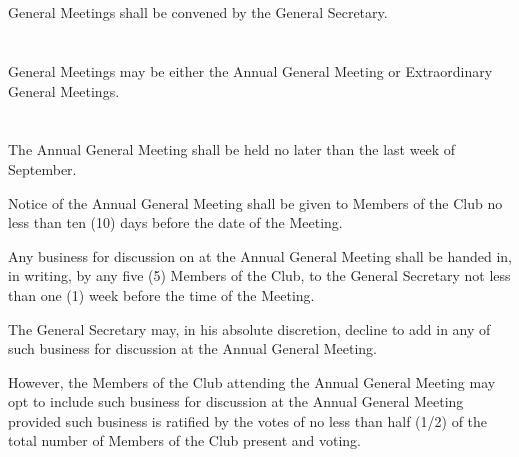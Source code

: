 
\section{}
General Meetings shall be convened by the General Secretary.

\section{}
General Meetings may be either the Annual General Meeting or Extraordinary General Meetings.

\section{}
The Annual General Meeting shall be held no later than the last week of September.
	\begin{legal}
	\item Notice of the Annual General Meeting shall be given to Members of the Club no less than ten (10) days before the date of the Meeting.
	\item Any business for discussion on at the Annual General Meeting shall be handed in, in writing, by any five (5) Members of the Club, to the General Secretary not less than one (1) week before the time of the Meeting.
		\begin{legal}
		\item The General Secretary may, in his absolute discretion, decline to add in any of such business for discussion at the Annual General Meeting.
		\item However, the Members of the Club attending the Annual General Meeting may opt to include such business for discussion at the Annual General Meeting provided such business is ratified by the votes of no less than half (1/2) of the total number of Members of the Club present and voting.
		\end{legal}
	\end{legal}

